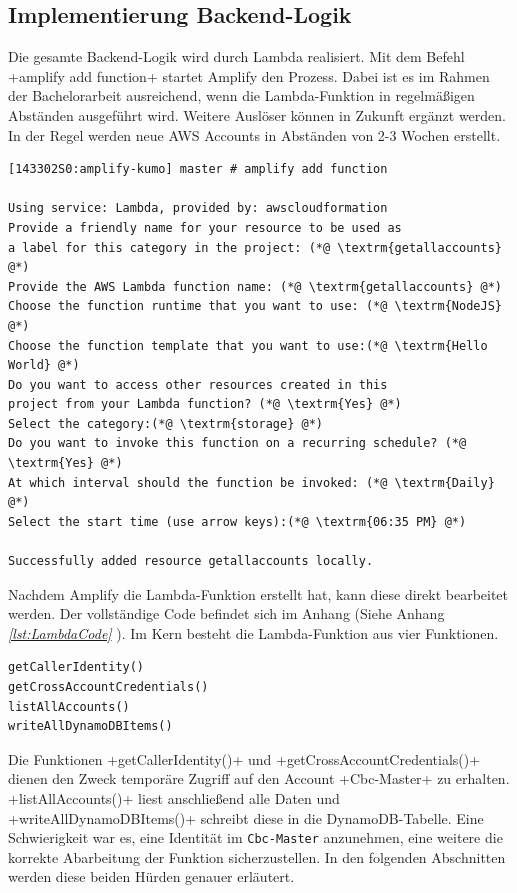 \subsection{Implementierung Backend-Logik}
\label{ImpLambda}
Die gesamte Backend-Logik wird durch Lambda realisiert.
Mit dem Befehl \spverb+amplify add function+ startet Amplify den Prozess.
Dabei ist es im Rahmen der Bachelorarbeit ausreichend, wenn die Lambda-Funktion in regelmäßigen Abständen ausgeführt wird.
Weitere Auslöser können in Zukunft ergänzt werden.
In der Regel werden neue AWS Accounts in Abständen von 2-3 Wochen erstellt.
\\
\begin{lstlisting}[basicstyle=\ttfamily\small, breaklines=true , frame = single, backgroundcolor=\color{flashwhite} ]
[143302S0:amplify-kumo] master # amplify add function

Using service: Lambda, provided by: awscloudformation
Provide a friendly name for your resource to be used as
a label for this category in the project: (*@ \textrm{getallaccounts} @*)
Provide the AWS Lambda function name: (*@ \textrm{getallaccounts} @*)
Choose the function runtime that you want to use: (*@ \textrm{NodeJS} @*)
Choose the function template that you want to use:(*@ \textrm{Hello World} @*)
Do you want to access other resources created in this
project from your Lambda function? (*@ \textrm{Yes} @*)
Select the category:(*@ \textrm{storage} @*)
Do you want to invoke this function on a recurring schedule? (*@ \textrm{Yes} @*)
At which interval should the function be invoked: (*@ \textrm{Daily} @*)
Select the start time (use arrow keys):(*@ \textrm{06:35 PM} @*)

Successfully added resource getallaccounts locally.
\end{lstlisting}

\clearpage
Nachdem Amplify die Lambda-Funktion erstellt hat, kann diese direkt bearbeitet werden.
Der vollständige Code befindet sich im Anhang (Siehe Anhang  \textit{\ref{lst:LambdaCode} }).
Im Kern besteht die Lambda-Funktion aus vier Funktionen.
\\

\begin{lstlisting}[basicstyle=\ttfamily\small, breaklines=true , frame = single, backgroundcolor=\color{flashwhite} ]
getCallerIdentity()
getCrossAccountCredentials()
listAllAccounts()
writeAllDynamoDBItems()
\end{lstlisting}


Die Funktionen \spverb+getCallerIdentity()+ und \spverb+getCrossAccountCredentials()+ dienen den Zweck temporäre Zugriff auf den Account \spverb+Cbc-Master+ zu erhalten.
\spverb+listAllAccounts()+ liest anschließend alle Daten und \spverb+writeAllDynamoDBItems()+ schreibt diese in die DynamoDB-Tabelle.
Eine Schwierigkeit war es, eine Identität im \verb+Cbc-Master+ anzunehmen, eine weitere die korrekte Abarbeitung der Funktion sicherzustellen.
In den folgenden Abschnitten werden diese beiden Hürden genauer erläutert.

